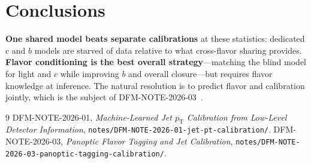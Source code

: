 \documentclass[11pt]{article}
\newcommand{\pt}{\ensuremath{p_\mathrm{T}}}
\begin{document}
\section{Conclusions}
\textbf{One shared model beats separate calibrations} at these statistics: dedicated
$c$ and $b$ models are starved of data relative to what cross-flavor sharing
provides. \textbf{Flavor conditioning is the best overall strategy}---matching the
blind model for light and $c$ while improving $b$ and overall closure---but requires
flavor knowledge at inference. The natural resolution is to predict flavor and
calibration jointly, which is the subject of DFM-NOTE-2026-03~\cite{note3}.

\begin{thebibliography}{9}
 DFM-NOTE-2026-01, \emph{Machine-Learned Jet \pt{} Calibration from
Low-Level Detector Information},
\texttt{notes/DFM-NOTE-2026-01-jet-pt-calibration/}.
 DFM-NOTE-2026-03, \emph{Panoptic Flavor Tagging and Jet Calibration},
\texttt{notes/DFM-NOTE-2026-03-panoptic-tagging-calibration/}.
\end{thebibliography}
\end{document}

